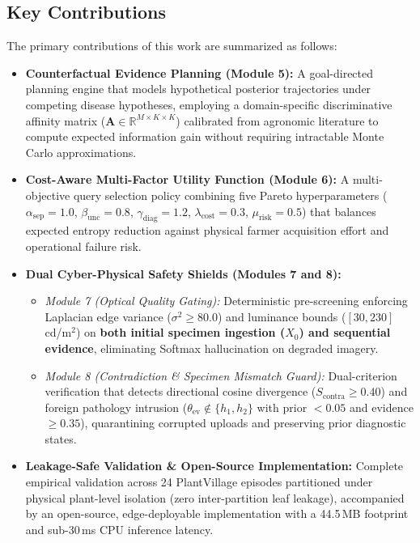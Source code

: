 \documentclass[conference]{IEEEtran}
\begin{document}
\subsection{Key Contributions}
The primary contributions of this work are summarized as follows:
\begin{itemize}
    \item \textbf{Counterfactual Evidence Planning (Module 5):} A goal-directed planning engine that models hypothetical posterior trajectories under competing disease hypotheses, employing a domain-specific discriminative affinity matrix ($\mathbf{A} \in \mathbb{R}^{M \times K \times K}$) calibrated from agronomic literature to compute expected information gain without requiring intractable Monte Carlo approximations.
    \item \textbf{Cost-Aware Multi-Factor Utility Function (Module 6):} A multi-objective query selection policy combining five Pareto hyperparameters ($\alpha_{\text{sep}} = 1.0$, $\beta_{\text{unc}} = 0.8$, $\gamma_{\text{diag}} = 1.2$, $\lambda_{\text{cost}} = 0.3$, $\mu_{\text{risk}} = 0.5$) that balances expected entropy reduction against physical farmer acquisition effort and operational failure risk.
    \item \textbf{Dual Cyber-Physical Safety Shields (Modules 7 and 8):}
    \begin{itemize}
        \item \textit{Module 7 (Optical Quality Gating):} Deterministic pre-screening enforcing Laplacian edge variance ($\sigma^2 \ge 80.0$) and luminance bounds ($[30, 230]$\,cd/m$^2$) on \textbf{both initial specimen ingestion ($X_0$) and sequential evidence}, eliminating Softmax hallucination on degraded imagery.
        \item \textit{Module 8 (Contradiction \& Specimen Mismatch Guard):} Dual-criterion verification that detects directional cosine divergence ($S_{\text{contra}} \ge 0.40$) and foreign pathology intrusion ($\theta_{\text{ev}} \notin \{h_1, h_2\}$ with prior $< 0.05$ and evidence $\ge 0.35$), quarantining corrupted uploads and preserving prior diagnostic states.
    \end{itemize}
    \item \textbf{Leakage-Safe Validation \& Open-Source Implementation:} Complete empirical validation across 24 PlantVillage episodes partitioned under physical plant-level isolation (zero inter-partition leaf leakage), accompanied by an open-source, edge-deployable implementation with a 44.5\,MB footprint and sub-30\,ms CPU inference latency.
\end{itemize}
\end{document}
